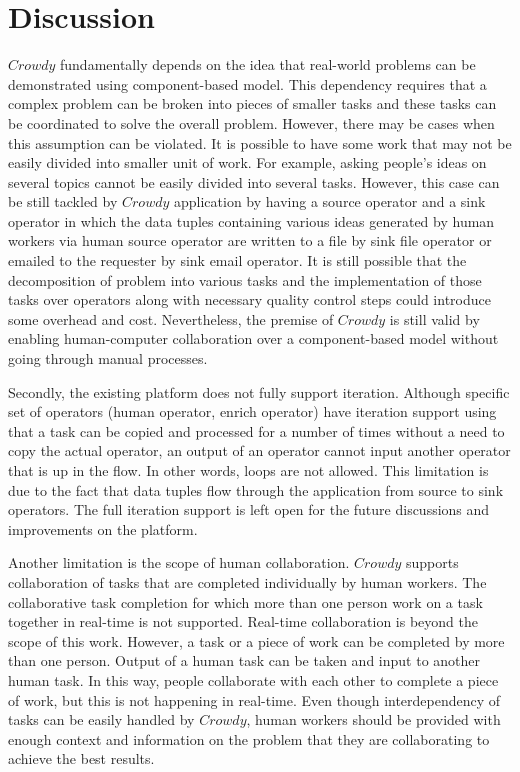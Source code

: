 \chapter{Discussion}
\label{chap:discussion}

$Crowdy$ fundamentally depends on the idea that real-world problems can be demonstrated using component-based model. This dependency requires that a complex problem can be broken into pieces of smaller tasks and these tasks can be coordinated to solve the overall problem. However, there may be cases when this assumption can be violated. It is possible to have some work that may not be easily divided into smaller unit of work. For example, asking people's ideas on several topics cannot be easily divided into several tasks. However, this case can be still tackled by $Crowdy$ application by having a source operator and a sink operator in which the data tuples containing various ideas generated by human workers via human source operator are written to a file by sink file operator or emailed to the requester by sink email operator. It is still possible that the decomposition of problem into various tasks and the implementation of those tasks over operators along with necessary quality control steps could introduce some overhead and cost. Nevertheless, the premise of $Crowdy$ is still valid by enabling human-computer collaboration over a component-based model without going through manual processes. 

Secondly, the existing platform does not fully support iteration. Although specific set of operators (human operator, enrich operator) have iteration support using that a task can be copied and processed for a number of times without a need to copy the actual operator, an output of an operator cannot input another operator that is up in the flow. In other words, loops are not allowed. This limitation is due to the fact that data tuples flow through the application from source to sink operators. The full iteration support is left open for the future discussions and improvements on the platform.

Another limitation is the scope of human collaboration. $Crowdy$ supports collaboration of tasks that are completed individually by human workers. The collaborative task completion for which more than one person work on a task together in real-time is not supported. Real-time collaboration is beyond the scope of this work. However, a task or a piece of work can be completed by more than one person. Output of a human task can be taken and input to another human task. In this way, people collaborate with each other to complete a piece of work, but this is not happening in real-time. Even though interdependency of tasks can be easily handled by $Crowdy$, human workers should be provided with enough context and information on the problem that they are collaborating to achieve the best results.

